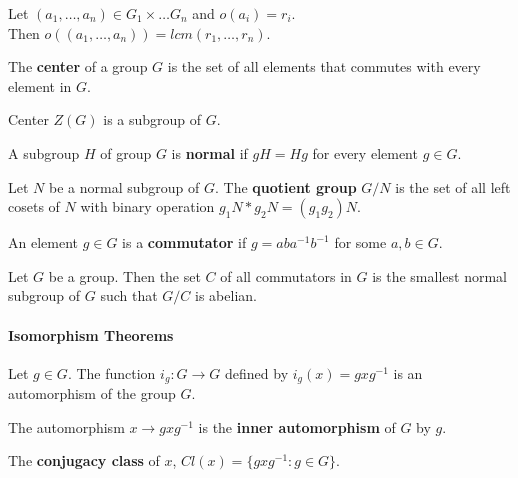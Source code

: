 \begin{theorem}
	Let $(a_1,\dots,a_n) \in G_1 \times \dots G_n$ and $o(a_i) = r_i$.\\
	Then $o((a_1,\dots,a_n)) = lcm(r_1,\dots,r_n)$.
\end{theorem}

\begin{definition}
	The \textbf{center} of a group $G$ is the set of all elements that commutes with every element in $G$.
\end{definition}
\begin{theorem}
	Center $Z(G)$ is a subgroup of $G$.
\end{theorem}

\begin{definition}
	A subgroup $H$ of group $G$ is \textbf{normal} if $gH = Hg$ for every element $g \in G$.
\end{definition}

\begin{definition}
	Let $N$ be a normal subgroup of $G$.
	The \textbf{quotient group} $G/N$ is the set of all left cosets of $N$ with binary operation $g_1N \ast g_2N = (g_1g_2)N$.
\end{definition}

\begin{definition}
	An element $g \in G$ is a \textbf{commutator} if $g=aba^{-1}b^{-1}$ for some $a,b \in G$.
\end{definition}

\begin{theorem}
	Let $G$ be a group.
	Then the set $C$ of all commutators in $G$ is the smallest normal subgroup of $G$ such that $G/C$ is abelian.
\end{theorem}

\paragraph{Isomorphism Theorems}
\begin{theorem}
	Let $g \in G$.
	The function $i_g : G \to G$ defined by $i_g(x) = gxg^{-1}$ is an automorphism of the group $G$.
\end{theorem}
\begin{definition}
	The automorphism $x \to gxg^{-1}$ is the \textbf{inner automorphism} of $G$ by $g$.
\end{definition}

\begin{definition}
	The \textbf{conjugacy class} of $x$, $Cl(x) = \{ gxg^{-1} : g \in G\}$.
\end{definition}

